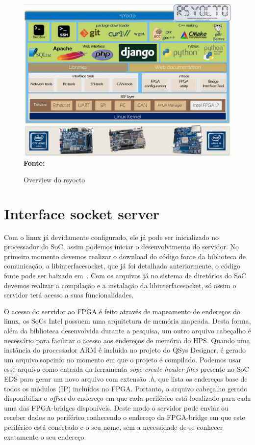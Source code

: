 \begin{figure}[ht]
	\caption{Overview do rsyocto}
	\begin{center}
		\includegraphics[scale=0.45]{imagens/rsYoctoLayers.jpg}\\
		{\small \textbf{Fonte:}\cite{rsyocto}}
    \end{center}\label{fig:rsyocto}
\end{figure}

\section{Interface socket server}
Com o linux já devidamente configurado, ele já pode ser inicializado no processador do SoC, assim podemos iniciar o desenvolvimento do servidor. No primeiro momento devemos realizar o download do código fonte da biblioteca de comunicação, a libinterfacesocket, que já foi detalhada anteriormente, o código fonte pode ser baixado em~\cite{interface-socket-server}. Com os arquivos já no sistema de diretórios do SoC devemos realizar a compilação e a instalação da libinterfacesocket, só assim o servidor terá acesso a suas funcionalidades. 

O acesso do servidor ao FPGA é feito através de mapeamento de endereços do linux, os SoCs Intel possuem uma arquitetura de memória mapeada. Desta forma, além da biblioteca desenvolvida durante a pesquisa, um outro arquivo cabeçalho é necessário para facilitar o acesso aos endereços de memória do HPS\@. Quando uma instância do processador ARM é incluída no projeto do QSys Designer, é gerado um arquivo.sopcinfo no momento em que o projeto é compilado. Podemos usar esse arquivo como entrada da ferramenta \textit{sopc-create-header-files} presente no SoC EDS para gerar um novo arquivo com extensão \textit{.h}, que lista os endereços base de todos os módulos (IP) incluídos no FPGA\@. Portanto, o arquivo cabeçalho gerado disponibiliza o \textit{offset} do endereço em que cada periférico está localizado para cada uma das FPGA-bridges disponíveis. Deste modo o servidor pode enviar ou receber dados ao periférico conhecendo o endereço da FPGA-bridge em que este periférico está conectado e o seu nome, sem a necessidade de se conhecer exatamente o seu endereço.

